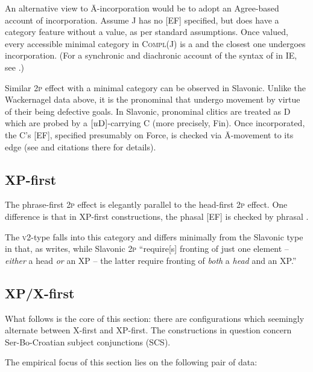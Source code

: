 \documentclass[output=paper]{langsci/langscibook}
\begin{document}
An alternative view to Ā-incorporation would be to adopt an Agree-based account
of incorporation. Assume J has no [\gls{EF}] specified, but does have a
category feature without a value, as per standard assumptions. Once valued,
every accessible minimal category in \textsc{Compl}(J) is a
 and the closest one undergoes incorporation. (For a
synchronic and diachronic account of the syntax of  in IE,
see \citealt{Mitrovic:2014phd,Mitrovic:2018oup,Mitrovic:2019}.)

Similar \textsc{2p} effect with a minimal category can be observed in Slavonic.
Unlike the Wackernagel data above, it is the pronominal  that undergo
movement by virtue of their being defective goals. In Slavonic, pronominal
clitics are treated as D which are probed by a
$[u\textsc{D}]$-car\-ry\-ing C (more precisely, Fin). Once
incorporated, the C's [\gls{EF}], specified presumably on
Force, is checked via Ā-movement to its edge (see
\citealt[386--399]{roberts:2012uq} and citations there for details).

\subsection{XP-first}\label{subsec:XP1}

The phrase-first \textsc{2p} effect is elegantly parallel to the head-first
\textsc{2p} effect. One difference is that in XP-first constructions, the
phasal [\gls{EF}] is checked by phrasal .

The  \textsc{v2}-type falls into this category and differs minimally
from the Slavonic type in that, as \textcite[401]{roberts:2012uq} writes, while
Slavonic \textsc{2p} ``require[s] fronting of just one
element -- \emph{either} a head \emph{or} an XP -- the latter require
fronting of \emph{both} a \emph{head} and an XP.''

\subsection{XP/X-first}\label{subsec:XP-X1}

What follows is the core of this section: there are configurations which
seemingly alternate between X-first and XP-first. The constructions in question
concern Ser-Bo-Croatian subject conjunctions (SCS).

The empirical focus of this section lies on the following pair of data:
\end{document}
